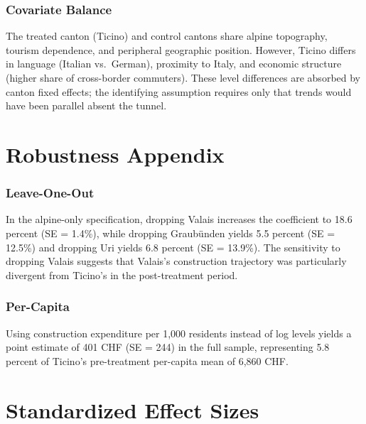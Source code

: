 \documentclass[12pt]{article}
\begin{document}
\subsubsection*{Covariate Balance} The treated canton (Ticino) and control cantons share alpine topography, tourism dependence, and peripheral geographic position. However, Ticino differs in language (Italian vs.\ German), proximity to Italy, and economic structure (higher share of cross-border commuters). These level differences are absorbed by canton fixed effects; the identifying assumption requires only that trends would have been parallel absent the tunnel.

\section{Robustness Appendix}

\subsubsection*{Leave-One-Out} In the alpine-only specification, dropping Valais increases the coefficient to 18.6 percent (SE = 1.4\%), while dropping Graub\"unden yields 5.5 percent (SE = 12.5\%) and dropping Uri yields 6.8 percent (SE = 13.9\%). The sensitivity to dropping Valais suggests that Valais's construction trajectory was particularly divergent from Ticino's in the post-treatment period.

\subsubsection*{Per-Capita} Using construction expenditure per 1,000 residents instead of log levels yields a point estimate of 401 CHF (SE = 244) in the full sample, representing 5.8 percent of Ticino's pre-treatment per-capita mean of 6,860 CHF.

\section{Standardized Effect Sizes}
\label{sec:sde}


\end{document}
